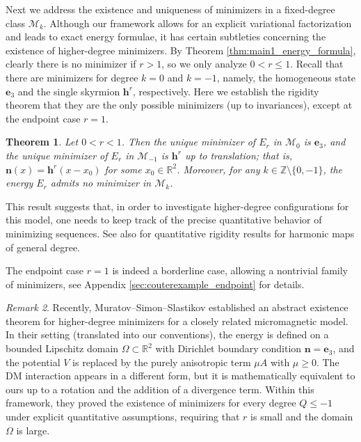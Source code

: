 \documentclass{amsart}
\numberwithin{equation}{section}
\newtheorem{theorem}{Theorem}[section]
\theoremstyle{definition}
\theoremstyle{remark}
\newtheorem{remark}[theorem]{Remark}
\newcommand{\R}{\mathbb{R}}
\newcommand{\Z}{\mathbb{Z}}
\newcommand{\e}{\mathbf{e}}
\newcommand{\boM}{\mathcal{M}}
\newcommand{\bh}{{\mathbf{h}}}
\newcommand{\bn}{{\mathbf{n}}}
\newcommand{\boe}{{\mathbf{e}}}
\begin{document}
Next we address the existence and uniqueness of minimizers in a fixed-degree class $\boM_k$.
Although our framework allows for an explicit variational factorization and leads to exact energy formulae, it has certain subtleties concerning the existence of higher-degree minimizers.
By Theorem \ref{thm:main1_energy_formula}, clearly there is no minimizer if $r>1$, so we only analyze $0<r\leq1$.
Recall that there are minimizers for degree $k=0$ and $k=-1$, namely, the homogeneous state $\boe_3$ and the single skyrmion $\bh^r$, respectively.
Here we establish the rigidity theorem that they are the only possible minimizers (up to invariances), except at the endpoint case $r=1$.

\begin{theorem}\label{thm:main4_rigidity}
    Let $0<r<1$.
    Then the unique minimizer of $E_r$ in $\boM_0$ is $\boe_3$, and the unique minimizer of $E_r$ in $\boM_{-1}$ is $\bh^r$ up to translation; that is, $\bn(x)=\bh^r(x-x_0)$ for some $x_0\in\R^2$.
    Moreover, for any $k\in\Z\setminus\{0,-1\}$, the energy $E_r$ admits no minimizer in $\boM_k$.
\end{theorem}

This result suggests that, in order to investigate higher-degree configurations for this model, one needs to keep track of the precise quantitative behavior of minimizing sequences.
See also \cite{MR4732301,rupflin2023sharp} for quantitative rigidity results for harmonic maps of general degree.

The endpoint case $r=1$ is indeed a borderline case, allowing a nontrivial family of minimizers, see Appendix \ref{sec:couterexample_endpoint} for details.

\begin{remark}\label{rem:comparison_MSS}
Recently, Muratov--Simon--Slastikov \cite{MR4961803} established an abstract existence theorem for higher-degree minimizers for a closely related micromagnetic model.  
In their setting (translated into our conventions), the energy is defined on a bounded Lipschitz domain $\Omega \subset \R^2$ with Dirichlet boundary condition $\bn = \e_3$, and the potential $V$ is replaced by the purely anisotropic term $\mu A$ with $\mu \ge 0$.  
The DM interaction appears in a different form, but it is mathematically equivalent to ours up to a rotation and the addition of a divergence term.  
Within this framework, they proved the existence of minimizers for every degree $Q \le -1$ under explicit quantitative assumptions, requiring that $r$ is small and the domain $\Omega$ is large.
\end{remark}
\end{document}
